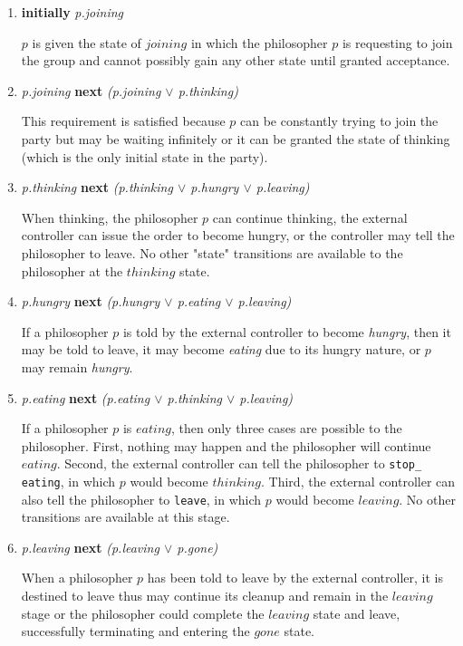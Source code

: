 \documentclass[11pt]{article}
\begin{document}
\begin{enumerate}[S1]
\item {\bfseries initially} {\it p.joining}

$p$ is given the state of $joining$ in which the philosopher $p$ is requesting to join the group and cannot possibly gain any other state until granted acceptance.

\item {\it p.joining} {\bfseries next} {\it (p.joining $\vee$ p.thinking)}

This requirement is satisfied because $p$ can be constantly trying to join the party but may be waiting infinitely or it can be granted the state of thinking (which is the only initial state in the party).

\item {\it p.thinking} {\bfseries next} {\it (p.thinking $\vee$ p.hungry $\vee$ p.leaving)}

When thinking, the philosopher $p$ can continue thinking, the external controller can issue the order to become hungry, or the controller may tell the philosopher to leave. No other "state" transitions are available to the philosopher at the $thinking$ state. 

\item {\it p.hungry} {\bfseries next} {\it (p.hungry $\vee$ p.eating $\vee$ p.leaving)}

If a philosopher $p$ is told by the external controller to become \emph{hungry}, then it may be told to leave, it may become \emph{eating} due to its hungry nature, or $p$ may remain \emph{hungry}. 

\item {\it p.eating} {\bfseries next} {\it (p.eating $\vee$ p.thinking $\vee$ p.leaving)}

If a philosopher $p$ is $eating$, then only three cases are possible to the philosopher. First, nothing may happen and the philosopher will continue $eating$. Second, the external controller can tell the philosopher to \texttt{stop\_ eating}, in which $p$ would become $thinking$. Third, the external controller can also tell the philosopher to \texttt{leave}, in which $p$ would become $leaving$. No other transitions are available at this stage.


\item {\it p.leaving} {\bfseries next} {\it (p.leaving $\vee$ p.gone)}

When a philosopher $p$ has been told to leave by the external controller, it is destined to leave thus may continue its cleanup and remain in the $leaving$ stage or the philosopher could complete the $leaving$ state and leave, successfully terminating and entering the $gone$ state.


\end{enumerate}
\end{document}
